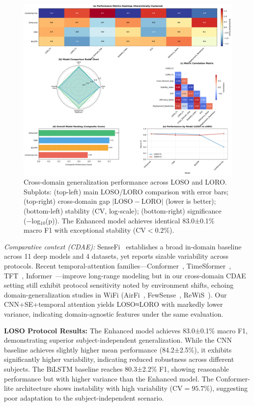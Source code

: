 \documentclass[journal]{IEEEtran}
\begin{document}
\begin{figure}[ht]
\centering
\includegraphics[width=\columnwidth]{figures/fig5_cross_domain.pdf}%
\caption{Cross-domain generalization performance across LOSO and LORO. Subplots: (top-left) main LOSO/LORO comparison with error bars; (top-right) cross-domain gap $|\text{LOSO}-\text{LORO}|$ (lower is better); (bottom-left) stability (CV, log-scale); (bottom-right) significance (−log$_{10}$(p)). The Enhanced model achieves identical 83.0±0.1\% macro F1 with exceptional stability ($\text{CV}<0.2\%$).}
\label{fig:cross_domain}
\end{figure}

\noindent\textit{Comparative context (CDAE):} SenseFi~\cite{yang2023sensefi} establishes a broad in-domain baseline across 11 deep models and 4 datasets, yet reports sizable variability across protocols. Recent temporal-attention families—Conformer~\cite{gulati2020conformer}, TimeSformer~\cite{bertasius2021timesformer}, TFT~\cite{lim2021tft}, Informer~\cite{zhou2021informer}—improve long-range modeling but in our cross-domain CDAE setting still exhibit protocol sensitivity noted by environment shifts, echoing domain-generalization studies in WiFi (AirFi~\cite{airfi2022}, FewSense~\cite{fewsense2022}, ReWiS~\cite{rewis2022}). Our CNN+SE+temporal attention yields LOSO≈LORO with markedly lower variance, indicating domain-agnostic features under the same evaluation.

\textbf{LOSO Protocol Results:} The Enhanced model achieves 83.0±0.1\% macro F1, demonstrating superior subject-independent generalization. While the CNN baseline achieves slightly higher mean performance (84.2±2.5\%), it exhibits significantly higher variability, indicating reduced robustness across different subjects. The BiLSTM baseline reaches 80.3±2.2\% F1, showing reasonable performance but with higher variance than the Enhanced model. The Conformer-lite architecture shows instability with high variability ($\text{CV}=95.7\%$), suggesting poor adaptation to the subject-independent scenario.
\end{document}
